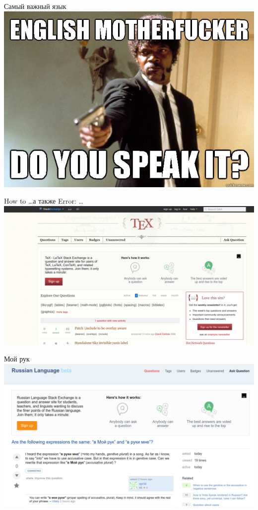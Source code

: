 \documentclass[aspectratio=169,newPxFont]{beamer}
\begin{document}
\begin{frame}{Самый важный язык}
\centering \includegraphics[width=0.7\linewidth]{english.jpg}\\
\end{frame}


\begin{frame}{How to \ldots а также Error: \ldots}
\centering \includegraphics[width=0.8\linewidth]{texexchan.png}\\
\end{frame}


\begin{frame}{Мой рук}
\centering \includegraphics[width=0.8\linewidth]{russia.png}\\
\end{frame}
\end{document}
